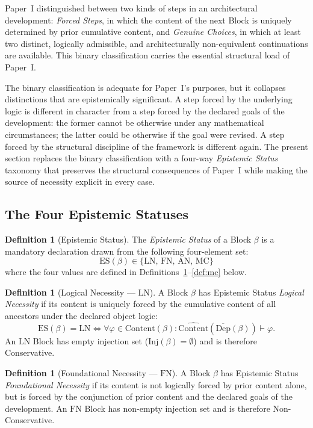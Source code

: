 \documentclass[12pt, a4paper]{article}
\theoremstyle{plain}
\theoremstyle{definition}
\newtheorem{definition}[theorem]{Definition}
\theoremstyle{remark}
\newcommand{\Inj}[1]{\mathrm{Inj}(#1)}
\newcommand{\DC}[1]{\overline{\mathrm{Dep}}(#1)}
\newcommand{\CC}[1]{\widehat{\mathrm{Content}}(#1)}
\newcommand{\ES}[1]{\mathrm{ES}(#1)}
\newcommand{\LN}{\mathrm{LN}}
\newcommand{\FN}{\mathrm{FN}}
\newcommand{\AN}{\mathrm{AN}}
\newcommand{\MC}{\mathrm{MC}}
\begin{document}
Paper~I distinguished between two kinds of steps in an architectural
development: \emph{Forced Steps}, in which the content of the next
Block is uniquely determined by prior cumulative content, and
\emph{Genuine Choices}, in which at least two distinct, logically
admissible, and architecturally non-equivalent continuations are
available. This binary classification carries the essential structural
load of Paper~I.

The binary classification is adequate for Paper~I's purposes, but it
collapses distinctions that are epistemically significant. A step
forced by the underlying logic is different in character from a step
forced by the declared goals of the development: the former cannot be
otherwise under any mathematical circumstances; the latter could be
otherwise if the goal were revised. A step forced by the structural
discipline of the framework is different again. The present section
replaces the binary classification with a four-way \emph{Epistemic
Status} taxonomy that preserves the structural consequences of
Paper~I while making the source of necessity explicit in every case.

\subsection{The Four Epistemic Statuses}
\label{subsec:ep-four}

\begin{definition}[Epistemic Status]
\label{def:es}
The \emph{Epistemic Status} of a Block $\beta$ is a mandatory
declaration drawn from the following four-element set:
\[
  \ES{\beta}
  \in \{\LN,\, \FN,\, \AN,\, \MC\}
\]
where the four values are defined in
Definitions~\ref{def:ln}--\ref{def:mc} below.
\end{definition}

\begin{definition}[Logical Necessity --- $\LN$]
\label{def:ln}
A Block $\beta$ has Epistemic Status \emph{Logical Necessity} if its
content is uniquely forced by the cumulative content of all ancestors
under the declared object logic:
\[
  \ES{\beta} = \LN
  \iff
  \forall \varphi \in \mathrm{Content}(\beta) :
  \CC{\DC{\beta}} \vdash \varphi.
\]
An $\LN$ Block has empty injection set ($\Inj{\beta} = \emptyset$)
and is therefore Conservative.
\end{definition}

\begin{definition}[Foundational Necessity --- $\FN$]
\label{def:fn}
A Block $\beta$ has Epistemic Status \emph{Foundational Necessity} if
its content is not logically forced by prior content alone, but is
forced by the conjunction of prior content and the declared goals of
the development. An $\FN$ Block has non-empty injection set and
is therefore Non-Conservative.
\end{definition}
\end{document}
